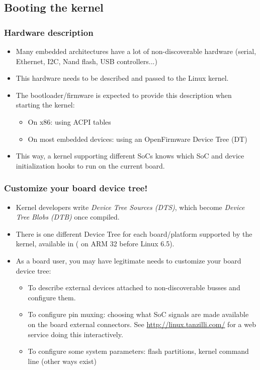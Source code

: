 \subsection{Booting the kernel}

\begin{frame}
  \frametitle{Hardware description}
  \begin{itemize}
  \item Many embedded architectures have a lot of non-discoverable
    hardware (serial, Ethernet, I2C, Nand flash, USB controllers...)
  \item This hardware needs to be described and passed to the Linux
    kernel.
  \item The bootloader/firmware is expected to provide this description
    when starting the kernel:
    \begin{itemize}
    \item On x86: using ACPI tables
    \item On most embedded devices: using an OpenFirmware Device Tree
      (DT)
    \end{itemize}
  \item This way, a kernel supporting different SoCs knows which
    SoC and device initialization hooks to run on the current board.
  \end{itemize}
\end{frame}

\begin{frame}
  \frametitle{Customize your board device tree!}
  \begin{itemize}
  \item Kernel developers write {\em Device Tree Sources (DTS)},
    which become {\em Device Tree Blobs (DTB)} once compiled.
  \item There is one different Device Tree for each board/platform
    supported by the kernel, available in
    ( on ARM 32 before Linux 6.5).
  \item As a board user, you may have legitimate needs to customize
    your board device tree:
    \begin{itemize}
    \item To describe external devices attached to non-discoverable
      busses and configure them.
    \item To configure pin muxing: choosing what SoC signals are
      made available on the board external connectors.
      See \url{http://linux.tanzilli.com/} for a web service doing this
      interactively.
    \item To configure some system parameters: flash partitions,
      kernel command line (other ways exist)
    \end{itemize}
  \end{itemize}
\end{frame}

